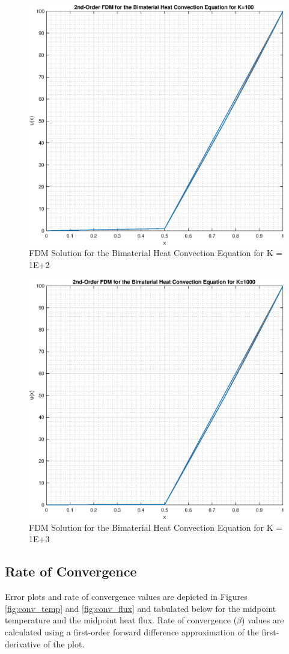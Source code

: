 \documentclass[10pt]{article}
\begin{document}
\begin{figure}[H]
	\begin{center}
		\includegraphics[width=0.6\linewidth]{solution_K_100}
		\caption{FDM Solution for the Bimaterial Heat Convection Equation for K = 1E+2}
	\end{center}
\end{figure}
\vfill
\begin{figure}[H]
	\begin{center}
		\includegraphics[width=0.6\linewidth]{solution_K_1000}
		\caption{FDM Solution for the Bimaterial Heat Convection Equation for K = 1E+3}
	\end{center}
\end{figure}

\newpage

\subsection*{Rate of Convergence}

Error plots and rate of convergence values are depicted in Figures \ref{fig:conv_temp} and \ref{fig:conv_flux} and tabulated below for the midpoint temperature and the midpoint heat flux. Rate of convergence ($\beta$) values are calculated using a first-order forward difference approximation of the first-derivative of the plot.
\end{document}
